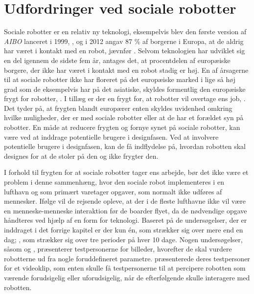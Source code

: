 \section{Udfordringer ved sociale robotter}
\label{UdfordringerSocialeRobotter}
%
Sociale robotter er en relativ ny teknologi, eksempelvis blev den første version af \textit{AIBO} lanceret i 1999, \textcite{WEB:AIBO}, og i 2012 angav 87 \% af borgerne i Europa, at de aldrig har været i kontakt med en robot, jævnfør . Selvom teknologien har udviklet sig en del igennem de sidste fem år, antages det, at procentdelen af europæiske borgere, der ikke har været i kontakt med en robot stadig er høj. En af årsagerne til at sociale robotter ikke har floreret på det europæiske marked i lige så høj grad som de eksempelvis har på det asiatiske, skyldes formentlig den europæiske frygt for robotter, \parencite[s. 28]{PDF:InTheCompanyofRobots}. I tillæg er der en frygt for, at robotter vil overtage ens job, \parencite[s. 42]{PDF:PerceptionAcceptance}. Det tyder på, at frygten blandt europærer enten skyldes uvidenhed omkring hvilke muligheder, der er med sociale robotter eller at de har et forældet syn på robotter. En måde at reducere frygten og fornye synet på sociale robotter, kan være ved at inddrage potentielle brugere i designfasen. Ved at involvere potentielle brugere i designfasen, kan de få indflydelse på, hvordan robotten skal designes for at de stoler på den og ikke frygter den.      

I forhold til frygten for at sociale robotter tager ens arbejde, bør det ikke være et problem i denne sammenhæng, hvor den sociale robot implementeres i en lufthavn og som primært varetager opgaver, som normalt ikke udføres af mennesker. Ifølge \textcite[s. 352]{PDF:TheImpactOfTraveler} vil de rejsende opleve, at der i de fleste lufthavne ikke vil være en menneske-menneske interaktion før de boarder flyet, da de nødvendige opgave håndteres ved hjælp af en form for teknologi. \blankline
%
Baseret på de undersøgelser, der er inddraget i det forrige kapitel er der kun én, som strækker sig over mere end en dag; \textcite[s. 3]{PDF:SharingALifeHarvey}, som strækker sig over tre perioder på hver 10 dage. Nogen undersøgelser, såsom \textcite[s. 273]{PDF:PerceptionAcceptance} og \textcite[s. 23]{PDF:CloseButNotStuck}, præsenterer testpersonerne for billeder, hvorefter de skal vurdere robotterne ud fra nogle foruddefineret parametre. \textcite[s. 62]{PDF:PerceptionAcceptance} præsenterede deres testpersoner for et videoklip, som enten skulle få testpersonerne til at percipere robotten som værende forudsigelig eller uforudsigelig, når de efterfølgende skulle interagere med robotten. 

